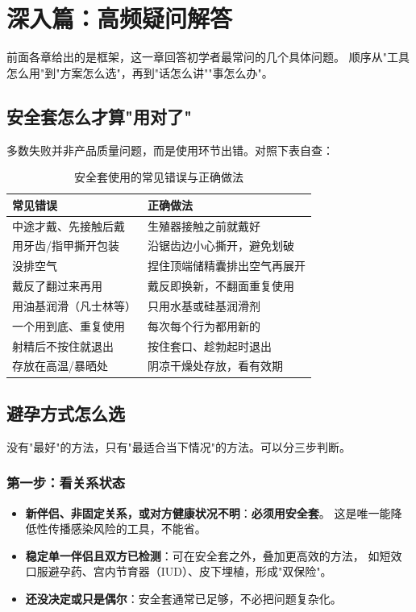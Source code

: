 \documentclass[12pt,UTF8,openany]{ctexbook}
\begin{document}
\chapter{深入篇：高频疑问解答}
\label{chap:faq}

前面各章给出的是框架，这一章回答初学者最常问的几个具体问题。
顺序从"工具怎么用"到"方案怎么选"，再到"话怎么讲""事怎么办"。

\section{安全套怎么才算"用对了"}

多数失败并非产品质量问题，而是使用环节出错。对照下表自查：

\begin{table}[htbp]
  \centering
  \caption{安全套使用的常见错误与正确做法}
  \begin{tabularx}{\textwidth}{@{}X X@{}}
    \toprule
    \textbf{常见错误} & \textbf{正确做法} \\
    \midrule
    中途才戴、先接触后戴 & 生殖器接触之前就戴好 \\
    用牙齿/指甲撕开包装   & 沿锯齿边小心撕开，避免划破 \\
    没排空气               & 捏住顶端储精囊排出空气再展开 \\
    戴反了翻过来再用       & 戴反即换新，不翻面重复使用 \\
    用油基润滑（凡士林等） & 只用水基或硅基润滑剂 \\
    一个用到底、重复使用   & 每次每个行为都用新的 \\
    射精后不按住就退出     & 按住套口、趁勃起时退出 \\
    存放在高温/暴晒处      & 阴凉干燥处存放，看有效期 \\
    \bottomrule
  \end{tabularx}
\end{table}

\section{避孕方式怎么选}

没有"最好"的方法，只有"最适合当下情况"的方法。可以分三步判断。

\subsection*{第一步：看关系状态}

\begin{itemize}
  \item \textbf{新伴侣、非固定关系，或对方健康状况不明}：\textbf{必须用安全套}。
        这是唯一能降低性传播感染风险的工具，不能省。
  \item \textbf{稳定单一伴侣且双方已检测}：可在安全套之外，叠加更高效的方法，
        如短效口服避孕药、宫内节育器（IUD）、皮下埋植，形成"双保险"。
  \item \textbf{还没决定或只是偶尔}：安全套通常已足够，不必把问题复杂化。
\end{itemize}
\end{document}
